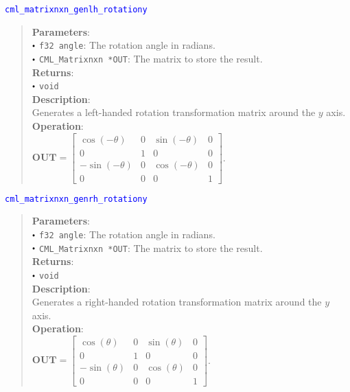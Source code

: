 \documentclass[a4paper,oneside,8pt]{extarticle}
\newcommand{\function}[1]{
  \noindent\textcolor{blue}{\texttt{#1}}
  \vspace{-0.3em}
}
\renewcommand{\dot}{\raisebox{0.3ex}{\scalebox{0.6}{$\bullet$}}}
\theoremstyle{definition}
\begin{document}
\function{cml\_matrixnxn\_genlh\_rotationy}
\begin{quote}
  \textbf{Parameters}: \\
  $\dot$ \texttt{f32 angle}: The rotation angle in radians. \\
  $\dot$ \texttt{CML\_Matrixnxn *OUT}: The matrix to store the result. \\
  \textbf{Returns}: \\
  $\dot$ \texttt{void} \\

  \vspace{-0.75em}
  \textbf{Description}: \\
  Generates a left-handed rotation transformation matrix around the $y$ axis. \\

  \vspace{-0.75em}
  \textbf{Operation}: \\
  $\mathbf{OUT} = \begin{bmatrix}
  \cos(-\theta) & 0 & \sin(-\theta) & 0 \\
  0 & 1 & 0 & 0 \\
  -\sin(-\theta) & 0 & \cos(-\theta) & 0 \\
  0 & 0 & 0 & 1
  \end{bmatrix}$. \\
\end{quote}

\function{cml\_matrixnxn\_genrh\_rotationy}
\begin{quote}
  \textbf{Parameters}: \\
  $\dot$ \texttt{f32 angle}: The rotation angle in radians. \\
  $\dot$ \texttt{CML\_Matrixnxn *OUT}: The matrix to store the result. \\
  \textbf{Returns}: \\
  $\dot$ \texttt{void} \\

  \vspace{-0.75em}
  \textbf{Description}: \\
  Generates a right-handed rotation transformation matrix around the $y$ axis. \\

  \vspace{-0.75em}
  \textbf{Operation}: \\
  $\mathbf{OUT} = \begin{bmatrix}
  \cos(\theta) & 0 & \sin(\theta) & 0 \\
  0 & 1 & 0 & 0 \\
  -\sin(\theta) & 0 & \cos(\theta) & 0 \\
  0 & 0 & 0 & 1
  \end{bmatrix}$. \\
\end{quote}
\end{document}
